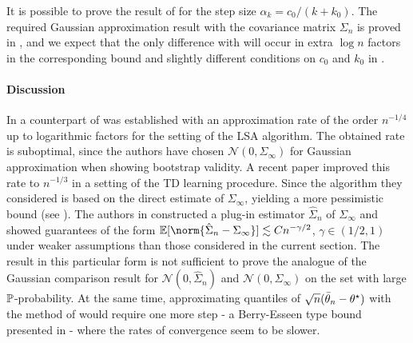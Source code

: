 \begin{remark}
\label{rem:step_size_remark}
It is possible to prove the result of  for the step size $\alpha_k = c_0/(k+k_0)$. The required Gaussian approximation result with the covariance matrix $\Sigma_n$ is proved in \cite{shao2022berry}, and we expect that the only difference with  will occur in extra $\log{n}$ factors in the corresponding bound and slightly different conditions on $c_0$ and $k_0$ in .
\end{remark}

\paragraph{Discussion} In \cite{samsonov2024gaussian} a counterpart of  was established with an approximation rate of the order $n^{-1/4}$ up to logarithmic factors for the setting of the LSA algorithm. The obtained rate is suboptimal, since the authors have chosen $\mathcal{N}(0,\Sigma_{\infty})$ for Gaussian approximation when showing bootstrap validity. A recent paper \cite{wu2024statistical} improved this rate to $n^{-1/3}$ in a setting of the TD learning procedure. Since the algorithm they considered is based on the direct estimate of $\Sigma_{\infty}$, yielding a more pessimistic bound (see \cite[Theorem 3.4 and 3.5]{wu2024statistical}). The authors in \cite{chen2020aos} constructed a plug-in estimator $\hat{\Sigma}_n$ of $\Sigma_{\infty}$ and showed guarantees of the form $\PE[\norm{\hat{\Sigma}_n - \Sigma_{\infty}}] \lesssim C n^{-\gamma/2}$, $\gamma \in (1/2,1)$ under weaker assumptions than those considered in the current section. The result in this particular form is not sufficient to prove the analogue of the Gaussian comparison result  for $\mathcal{N}(0,\hat{\Sigma}_n)$ and $\mathcal{N}(0,\Sigma_{\infty})$ on the set with large $\mathbb{P}$-probability. At the same time, approximating quantiles of $\sqrt{n}(\bar{\theta}_n - \theta^\star)$ with the method of \cite{chen2020aos} would require one more step - a Berry-Esseen type bound presented in   - where the rates of convergence seem to be slower.




